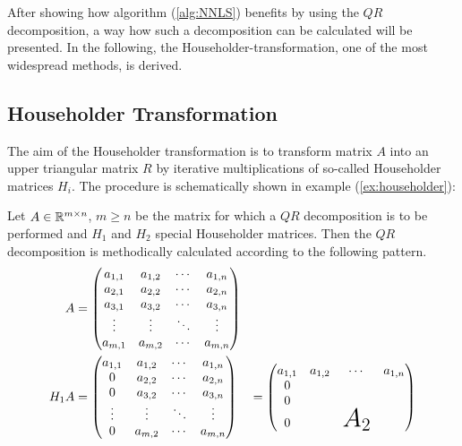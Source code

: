 After showing how algorithm (\ref{alg:NNLS}) benefits by using the $QR$ decomposition, a way how such a decomposition can be calculated will be presented. In the following, the Householder-transformation, one of the most widespread methods, is derived.

\subsection{Householder Transformation}  

The aim of the Householder transformation is to transform matrix $A$ into an upper triangular matrix $R$ by iterative multiplications of so-called Householder matrices $H_i$. 
The procedure is schematically shown in example (\ref{ex:householder}): 

\begin{example}\label{ex:householder} 
	Let $A \in \mathbb{R}^{m \times n}$, $m \geq n$ be the matrix for which a $QR$ decomposition is to be performed and $H_1$ and $H_2$ special Householder matrices. Then the $QR$ decomposition is methodically calculated according to the following pattern. 
	\begin{subequations}
		\begin{align*}
		A &= 
		\begin{pmatrix}
		a_{1,1} & a_{1,2} & \cdots & a_{1,n} \\
		a_{2,1} & a_{2,2} & \cdots & a_{2,n} \\
		a_{3,1} & a_{3,2} & \cdots & a_{3,n} \\
		\vdots  & \vdots  & \ddots & \vdots  \\
		a_{m,1} & a_{m,2} & \cdots & a_{m,n} 
		\end{pmatrix} 
		\\
		H_1 A &= 
		\begin{pmatrix}
		a_{1,1} & a_{1,2} & \cdots & a_{1,n} \\
		0		& a_{2,2} & \cdots & a_{2,n} \\
		0		& a_{3,2} & \cdots & a_{3,n} \\
		\vdots  & \vdots  & \ddots & \vdots  \\
		0		& a_{m,2} & \cdots & a_{m,n} 
		\end{pmatrix} 
		&= 
		\begin{pmatrix}
		a_{1,1} & a_{1,2} & \cdots & a_{1,n} \\
		0 		&  		  &		   &  \\
		0 		&  		  &		   &  \\
		0  		&   	  & \text{\huge$A_2$} &   \\

\end{pmatrix}
\end{align*}
\end{subequations}
\end{example}
